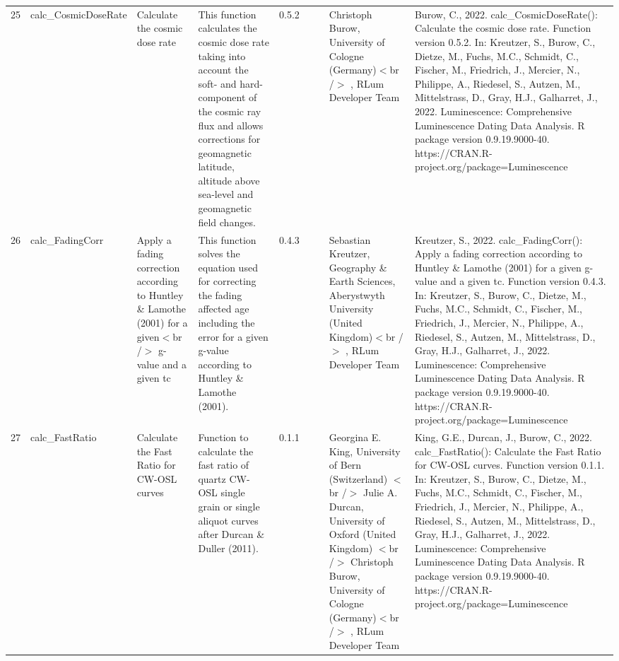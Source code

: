 \begin{table}[ht]
\begin{tabular}{rllllllll}
 \\ 
  25 & calc\_CosmicDoseRate & Calculate the cosmic dose rate & This function calculates the cosmic dose rate taking into account the soft- and hard-component of the cosmic ray flux and allows corrections for geomagnetic latitude, altitude above sea-level and geomagnetic field changes. & 0.5.2
 &  &  & Christoph Burow, University of Cologne (Germany)$<$br /$>$ , RLum Developer Team & Burow, C., 2022. calc\_CosmicDoseRate(): Calculate the cosmic dose rate. Function version 0.5.2. In: Kreutzer, S., Burow, C., Dietze, M., Fuchs, M.C., Schmidt, C., Fischer, M., Friedrich, J., Mercier, N., Philippe, A., Riedesel, S., Autzen, M., Mittelstrass, D., Gray, H.J., Galharret, J., 2022. Luminescence: Comprehensive Luminescence Dating Data Analysis. R package version 0.9.19.9000-40. https://CRAN.R-project.org/package=Luminescence
 \\ 
  26 & calc\_FadingCorr & Apply a fading correction according to Huntley \& Lamothe (2001) for a given$<$br /$>$ g-value and a given tc & This function solves the equation used for correcting the fading affected age including the error for a given g-value according to Huntley \& Lamothe (2001). & 0.4.3
 &  &  & Sebastian Kreutzer, Geography \& Earth Sciences, Aberystwyth University (United Kingdom)$<$br /$>$ , RLum Developer Team & Kreutzer, S., 2022. calc\_FadingCorr(): Apply a fading correction according to Huntley \& Lamothe (2001) for a given g-value and a given tc. Function version 0.4.3. In: Kreutzer, S., Burow, C., Dietze, M., Fuchs, M.C., Schmidt, C., Fischer, M., Friedrich, J., Mercier, N., Philippe, A., Riedesel, S., Autzen, M., Mittelstrass, D., Gray, H.J., Galharret, J., 2022. Luminescence: Comprehensive Luminescence Dating Data Analysis. R package version 0.9.19.9000-40. https://CRAN.R-project.org/package=Luminescence
 \\ 
  27 & calc\_FastRatio & Calculate the Fast Ratio for CW-OSL curves & Function to calculate the fast ratio of quartz CW-OSL single grain or single aliquot curves after Durcan \& Duller (2011). & 0.1.1
 &  &  & Georgina E. King, University of Bern (Switzerland)  $<$br /$>$ Julie A. Durcan, University of Oxford (United Kingdom)  $<$br /$>$ Christoph Burow, University of Cologne (Germany)$<$br /$>$ , RLum Developer Team & King, G.E., Durcan, J., Burow, C., 2022. calc\_FastRatio(): Calculate the Fast Ratio for CW-OSL curves. Function version 0.1.1. In: Kreutzer, S., Burow, C., Dietze, M., Fuchs, M.C., Schmidt, C., Fischer, M., Friedrich, J., Mercier, N., Philippe, A., Riedesel, S., Autzen, M., Mittelstrass, D., Gray, H.J., Galharret, J., 2022. Luminescence: Comprehensive Luminescence Dating Data Analysis. R package version 0.9.19.9000-40. https://CRAN.R-project.org/package=Luminescence

\end{tabular}
\end{table}
